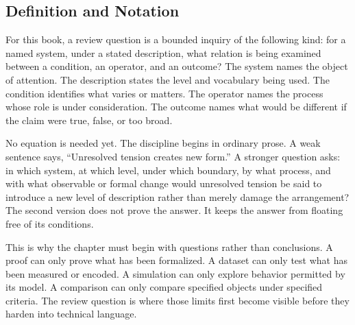 \documentclass[11pt,a4paper,openany]{book}
\begin{document}
\subsection{Definition and Notation}
For this book, a review question is a bounded inquiry of the following kind: for a named system, under a stated description, what relation is being examined between a condition, an operator, and an outcome? The system names the object of attention. The description states the level and vocabulary being used. The condition identifies what varies or matters. The operator names the process whose role is under consideration. The outcome names what would be different if the claim were true, false, or too broad. \cite{raf_networks,bak_soc}\par
No equation is needed yet. The discipline begins in ordinary prose. A weak sentence says, ``Unresolved tension creates new form.'' A stronger question asks: in which system, at which level, under which boundary, by what process, and with what observable or formal change would unresolved tension be said to introduce a new level of description rather than merely damage the arrangement? The second version does not prove the answer. It keeps the answer from floating free of its conditions.\par
This is why the chapter must begin with questions rather than conclusions. A proof can only prove what has been formalized. A dataset can only test what has been measured or encoded. A simulation can only explore behavior permitted by its model. A comparison can only compare specified objects under specified criteria. The review question is where those limits first become visible before they harden into technical language.\par
\end{document}
